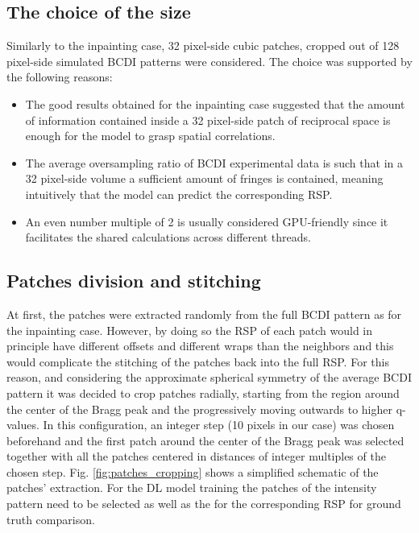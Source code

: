 \subsection{The choice of the size}

Similarly to the inpainting case, 32 pixel-side cubic patches, cropped out of 128 pixel-side simulated
BCDI patterns were considered. The choice was supported by the following reasons: 

\begin{itemize}
    \item The good results obtained for the inpainting case suggested that the amount of information contained inside a
    32 pixel-side patch of reciprocal space is enough for the model to grasp spatial correlations.  
    \item The average oversampling ratio of BCDI experimental data is such that in a 32 pixel-side volume a sufficient
    amount of fringes is contained, meaning intuitively that the model can predict the corresponding RSP. 
    \item An even number multiple of 2 is usually considered GPU-friendly since it facilitates the shared calculations across
    different threads. 
\end{itemize}

\subsection{Patches division and stitching}\label{sbsec:patches_creation}
At first, the patches were extracted randomly from the full BCDI pattern as for the inpainting case. 
However, by doing so the RSP of each patch would in principle have different offsets and different wraps than the neighbors 
and this would complicate the stitching of the patches back into the full RSP. 
For this reason, and considering the approximate spherical symmetry of the average BCDI pattern it was decided to 
crop patches radially, starting from the region around the center of the Bragg peak and the progressively moving 
outwards to higher q-values. 
In this configuration, an integer step (10 pixels in our case) was chosen beforehand and the first patch around the center 
of the Bragg peak was selected together with all the patches centered in distances of integer multiples of the chosen step. 
Fig. \ref{fig:patches_cropping} shows a simplified schematic of the patches' extraction. 
For the DL model training the patches of the intensity pattern need to be selected as well as the for the corresponding 
RSP for ground truth comparison. 


